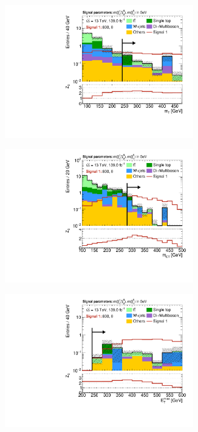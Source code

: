 \begin{figure}
	\centering
	\begin{subfigure}[b]{0.5\linewidth}
		\centering\includegraphics[width=0.9\textwidth]{N-1_cut_scan/n1_800_0/mt}
	\end{subfigure}\hfill
	\begin{subfigure}[b]{0.5\linewidth}
		\centering\includegraphics[width=0.9\textwidth]{N-1_cut_scan/n1_800_0/mct}
	\end{subfigure}\hfill
	\par\medskip
	\begin{subfigure}[b]{0.5\linewidth}
		\centering\includegraphics[width=0.9\textwidth]{N-1_cut_scan/n1_800_0/met}

\end{subfigure}
\end{figure}

